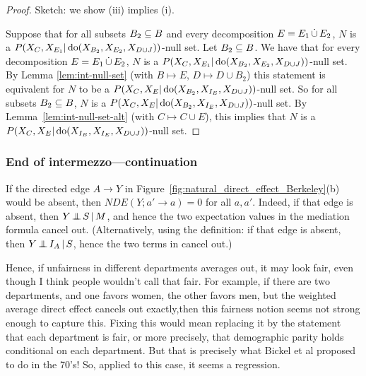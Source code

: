 \begin{proof}
  Sketch: we show (iii) implies (i).

  Suppose that for all subsets $B_2 \subseteq B$ and every decomposition $E=E_1 \,\dot{\cup}\, E_2$, $N$ is a $P(X_C,X_{E_1}|\operatorname{do}(X_{B_2},X_{E_2},X_{D\cup J}))$-null set.
  Let $B_2 \subseteq B$.
  We have that for every decomposition $E=E_1 \,\dot{\cup}\, E_2$, $N$ is a $P(X_C,X_{E_1}|\operatorname{do}(X_{B_2},X_{E_2},X_{D\cup J}))$-null set. 
  By Lemma \ref{lem:int-null-set} (with $B \mapsto E$, $D \mapsto D \cup B_2$) this statement is equivalent for $N$ to be a $P(X_C,X_E|\operatorname{do}(X_{B_2},X_{I_E},X_{D\cup J}))$-null set.
  So for all subsets $B_2 \subseteq B$, $N$ is a $P(X_C,X_E|\operatorname{do}(X_{B_2},X_{I_E},X_{D\cup J}))$-null set.
  By Lemma~\ref{lem:int-null-set-alt} (with $C \mapsto C \cup E$), this implies that $N$ is a $P(X_C,X_E|\operatorname{do}(X_{I_B},X_{I_E},X_{D\cup J}))$-null set.

\end{proof}

\subsubsection{End of intermezzo---continuation}

\begin{Rem}
If the directed edge $A \to Y$ in Figure~\ref{fig:natural_direct_effect_Berkeley}(b) would be absent, then $NDE(Y; a' \to a) = 0$ for all $a,a'$.
Indeed, if that edge is absent, then $Y \operatorname*{\perp\mkern-11mu\perp} S \operatorname*{|} M$, and hence the two expectation values in the mediation formula cancel out.
(Alternatively, using the definition: if that edge is absent, then $Y \operatorname*{\perp\mkern-11mu\perp} I_A \operatorname*{|} S$, hence the two terms in  cancel out.)
\end{Rem}

Hence, if unfairness in different departments averages out, it may look fair, even though I think people wouldn't call that fair.
For example, if there are two departments, and one favors women, the other favors men, but the weighted average direct effect cancels out exactly,then this fairness notion seems not strong enough to capture this.
Fixing this would mean replacing it by the statement that each department is fair, or more precisely, that demographic parity holds conditional on each department.
But that is precisely what Bickel et al proposed to do in the 70's! 
So, applied to this case, it seems a regression.

